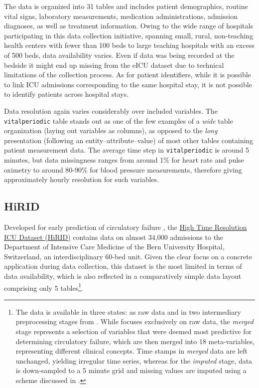 \documentclass[
  notitle]{jss}
\begin{document}
The data is organized into 31 tables and includes patient demographics,
routine vital signs, laboratory measurements, medication
administrations, admission diagnoses, as well as treatment information.
Owing to the wide range of hospitals participating in this data
collection initiative, spanning small, rural, non-teaching health
centers with fewer than 100 beds to large teaching hospitals with an
excess of 500 beds, data availability varies. Even if data was being
recorded at the bedside it might end up missing from the eICU dataset
due to technical limitations of the collection process. As for patient
identifiers, while it is possible to link ICU admissions corresponding
to the same hospital stay, it is not possible to identify patients
across hospital stays.

Data resolution again varies considerably over included variables. The
\texttt{vitalperiodic} table stands out as one of the few examples of a
\emph{wide} table organization (laying out variables as columns), as
opposed to the \emph{long} presentation (following an
entity--attribute--value) of most other tables containing patient
measurement data. The average time step in \texttt{vitalperiodic} is
around 5 minutes, but data missingness ranges from around 1\% for heart
rate and pulse oximetry to around 80-90\% for blood pressure
measurements, therefore giving approximately hourly resolution for such
variables.

\hypertarget{hirid}{%
\subsection{HiRID}\label{hirid}}

Developed for early prediction of circulatory failure
\citep{hyland2020}, the
\href{https://physionet.org/content/hirid/1.0/}{High Time Resolution ICU
Dataset (HiRID)} contains data on almost 34,000 admissions to the
Department of Intensive Care Medicine of the Bern University Hospital,
Switzerland, an interdisciplinary 60-bed unit. Given the clear focus on
a concrete application during data collection, this dataset is the most
limited in terms of data availability, which is also reflected in a
comparatively simple data layout comprising only 5 tables\footnote{The
  data is available in three states: as raw data and in two intermediary
  preprocessing stages from \citep{hyland2020}. While  focuses
  exclusively on raw data, the \emph{merged} stage represents a
  selection of variables that were deemed most predictive for
  determining circulatory failure, which are then merged into 18
  meta-variables, representing different clinical concepts. Time stamps
  in \emph{merged} data are left unchanged, yielding irregular time
  series, whereas for the \emph{imputed} stage, data is down-sampled to
  a 5 minute grid and missing values are imputed using a scheme
  discussed in \citep{hyland2020}.}.
\end{document}

